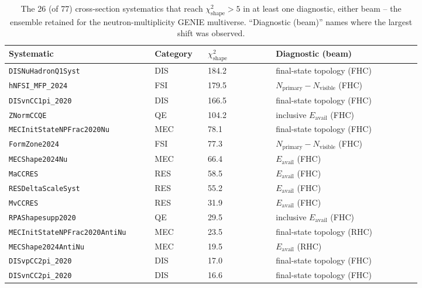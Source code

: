 \begin{table}[htbp]
    \centering
    \caption{The 26 (of 77) cross-section systematics that reach
    $\chi^2_{\mathrm{shape}}>5$ in at least one diagnostic, either beam --
    the ensemble retained for the neutron-multiplicity GENIE multiverse.
    ``Diagnostic (beam)'' names where the largest shift was observed.}
    \label{table:relevantSysts}
    \begin{tabular}{p{0.28\linewidth} p{0.10\linewidth} p{0.14\linewidth} p{0.30\linewidth}}
        \toprule
        \textbf{Systematic} & \textbf{Category} & \textbf{$\chi^2_{\mathrm{shape}}$} & \textbf{Diagnostic (beam)} \\
        \midrule
        \texttt{DISNuHadronQ1Syst}        & DIS & 184.2 & final-state topology (FHC) \\
        \texttt{hNFSI\_MFP\_2024}          & FSI & 179.5 & $N_{\mathrm{primary}}-N_{\mathrm{visible}}$ (FHC) \\
        \texttt{DISvnCC1pi\_2020}          & DIS & 166.5 & final-state topology (FHC) \\
        \texttt{ZNormCCQE}                 & QE  & 104.2 & inclusive $E_{\mathrm{avail}}$ (FHC) \\
        \texttt{MECInitStateNPFrac2020Nu}  & MEC & 78.1  & final-state topology (FHC) \\
        \texttt{FormZone2024}              & FSI & 77.3  & $N_{\mathrm{primary}}-N_{\mathrm{visible}}$ (FHC) \\
        \texttt{MECShape2024Nu}            & MEC & 66.4  & $E_{\mathrm{avail}}$ (FHC) \\
        \texttt{MaCCRES}                   & RES & 58.5  & $E_{\mathrm{avail}}$ (FHC) \\
        \texttt{RESDeltaScaleSyst}         & RES & 55.2  & $E_{\mathrm{avail}}$ (FHC) \\
        \texttt{MvCCRES}                   & RES & 31.9  & $E_{\mathrm{avail}}$ (FHC) \\
        \texttt{RPAShapesupp2020}          & QE  & 29.5  & inclusive $E_{\mathrm{avail}}$ (FHC) \\
        \texttt{MECInitStateNPFrac2020AntiNu} & MEC & 23.5 & final-state topology (RHC) \\
        \texttt{MECShape2024AntiNu}        & MEC & 19.5  & $E_{\mathrm{avail}}$ (RHC) \\
        \texttt{DISvpCC2pi\_2020}          & DIS & 17.0  & final-state topology (FHC) \\
        \texttt{DISvnCC2pi\_2020}          & DIS & 16.6  & final-state topology (FHC) \\

\end{tabular}
\end{table}

